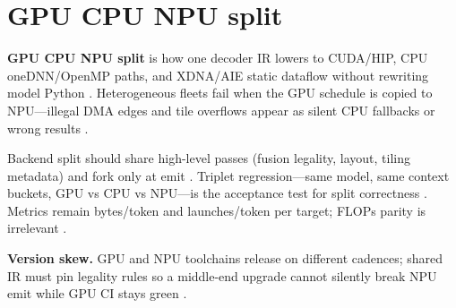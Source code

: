 \section{GPU CPU NPU split}
\label{sec:ch13_gpu_cpu_npu_split}

\textbf{GPU CPU NPU split} is how one decoder IR lowers to CUDA/HIP, CPU oneDNN/OpenMP paths, and XDNA/AIE static dataflow without rewriting model Python \citep{yirage2026,chen2020compilerbasedhardw,amd2024xdna,amd2024aie,patel2025llminference,taxbreak2026,memoryfloor2026,dlbook,kwon2023vllm,liu2024deepseekv3,dao2022flashattention,semianalysis2024tma,dao2023flashdecoding,nvidia2022hopper,nvidia2024cudagraphs}. Heterogeneous fleets fail when the GPU schedule is copied to NPU---illegal DMA edges and tile overflows appear as silent CPU fallbacks or wrong results \citep{amd2024xdna,amd2024aie,yirage2026,chen2020compilerbasedhardw,patel2025llminference,taxbreak2026,memoryfloor2026,dlbook,kwon2023vllm,liu2024deepseekv3,dao2022flashattention,semianalysis2024tma,dao2023flashdecoding,nvidia2022hopper,nvidia2024cudagraphs}.

Backend split should share high-level passes (fusion legality, layout, tiling metadata) and fork only at emit \citep{yirage2026,chen2020compilerbasedhardw,liu2024deepseekv3,amd2024xdna,amd2024aie,nvidia2022hopper,semianalysis2024tma,patel2025llminference,taxbreak2026,memoryfloor2026,kwon2023vllm,dlbook,dao2022flashattention,dao2023flashdecoding,nvidia2024cudagraphs}. Triplet regression---same model, same context buckets, GPU vs CPU vs NPU---is the acceptance test for split correctness \citep{patel2025llminference,yirage2026,chen2020compilerbasedhardw,amd2024xdna,amd2024aie,taxbreak2026,memoryfloor2026,semianalysis2024tma,dlbook,kwon2023vllm,liu2024deepseekv3,dao2022flashattention,dao2023flashdecoding,nvidia2022hopper,nvidia2024cudagraphs}. Metrics remain bytes/token and launches/token per target; FLOPs parity is irrelevant \citep{taxbreak2026,memoryfloor2026,patel2025llminference,yirage2026,chen2020compilerbasedhardw,amd2024xdna,amd2024aie,dlbook,kwon2023vllm,liu2024deepseekv3,dao2022flashattention,semianalysis2024tma,dao2023flashdecoding,nvidia2022hopper,nvidia2024cudagraphs}.

\textbf{Version skew.} GPU and NPU toolchains release on different cadences; shared IR must pin legality rules so a middle-end upgrade cannot silently break NPU emit while GPU CI stays green \citep{yirage2026,chen2020compilerbasedhardw,amd2024aie,amd2024xdna,patel2025llminference,taxbreak2026,memoryfloor2026,dlbook,kwon2023vllm,liu2024deepseekv3,dao2022flashattention,semianalysis2024tma,dao2023flashdecoding,nvidia2022hopper,nvidia2024cudagraphs}.


